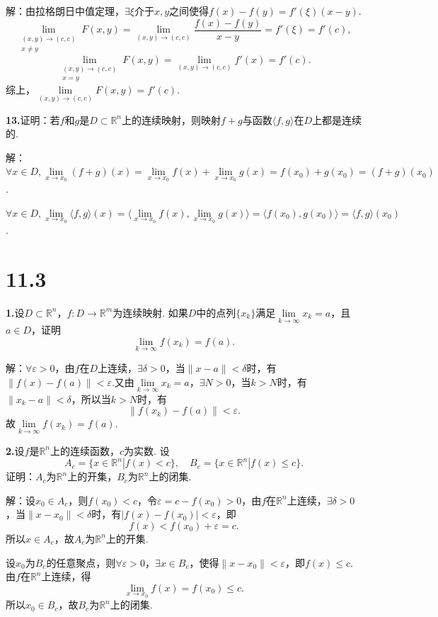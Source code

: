 \documentclass[12pt, a4paper]{article}
\newcommand{\RR}{\mathbb{R}}
\begin{document}
解：由拉格朗日中值定理，\(\exists \xi\)介于\(x, y\)之间使得\(f(x) - f(y) = f'(\xi)(x - y)\).
\[\lim_{\substack{(x, y) \to (c, c) \\ x \neq y}} F(x, y) = \lim_{(x, y) \to (c, c)} \frac{f(x) - f(y)}{x - y} = f'(\xi) = f'(c),\]
\[\lim_{\substack{(x, y) \to (c, c) \\ x = y}} F(x, y) = \lim_{(x, y) \to (c, c)} f'(x) = f'(c).\]
综上，\(\lim\limits_{(x, y) \to (c, c)} F(x, y) = f'(c)\).

\textbf{13.}证明：若\(f\)和\(g\)是\(D \subset \RR^n\)上的连续映射，则映射\(f + g\)与函数\(\langle f, g \rangle\)在\(D\)上都是连续的.

解：\(\forall x \in D, \lim\limits_{x \to x_0} (f + g)(x) = \lim\limits_{x \to x_0} f(x) + \lim\limits_{x \to x_0} g(x) = f(x_0) + g(x_0) = (f + g)(x_0)\).

\(\forall x \in D, \lim\limits_{x \to x_0} \langle f, g \rangle (x) = \langle \lim\limits_{x \to x_0} f(x), \lim\limits_{x \to x_0} g(x) \rangle = \langle f(x_0), g(x_0) \rangle = \langle f, g \rangle (x_0)\).

\section*{11.3}
\textbf{1.}设\(D \subset \RR^n\)，\(f: D \to \RR^m\)为连续映射. 如果\(D\)中的点列\(\{x_k\}\)满足\(\lim\limits_{k \to \infty} x_k = a\)，且\(a \in D\)，证明
\[\lim_{k \to \infty} f(x_k) = f(a).\]

解：\(\forall \varepsilon > 0\)，由\(f\)在\(D\)上连续，\(\exists \delta > 0\)，当\(\|x - a\| < \delta\)时，有\(\|f(x) - f(a)\| < \varepsilon\).又由\(\lim\limits_{k \to \infty} x_k = a\)，\(\exists N > 0\)，当\(k > N\)时，有\(\|x_k - a\| < \delta\)，所以当\(k > N\)时，有
\[\|f(x_k) - f(a)\| < \varepsilon.\]
故\(\lim\limits_{k \to \infty} f(x_k) = f(a)\).

\textbf{2.}设\(f\)是\(\RR^n\)上的连续函数，\(c\)为实数. 设
\[A_c = \{x \in \RR^n | f(x) < c\}, \quad B_c = \{x \in \RR^n | f(x) \leq c\}.\]
证明：\(A_c\)为\(\RR^n\)上的开集，\(B_c\)为\(\RR^n\)上的闭集.

解：设\(x_0 \in A_c\)，则\(f(x_0) < c\)，令\(\varepsilon = c - f(x_0) > 0\)，由\(f\)在\(\RR^n\)上连续，\(\exists \delta > 0\)，当\(\|x - x_0\| < \delta\)时，有\(|f(x) - f(x_0)| < \varepsilon\)，即
\[f(x) < f(x_0) + \varepsilon = c.\]
所以\(x \in A_c\)，故\(A_c\)为\(\RR^n\)上的开集.

设\(x_0\)为\(B_c\)的任意聚点，则\(\forall \varepsilon > 0\)，\(\exists x \in B_c\)，使得\(\|x - x_0\| < \varepsilon\)，即\(f(x) \leq c\).由\(f\)在\(\RR^n\)上连续，得
\[\lim_{x \to x_0} f(x) = f(x_0) \leq c.\]
所以\(x_0 \in B_c\)，故\(B_c\)为\(\RR^n\)上的闭集.
\end{document}
